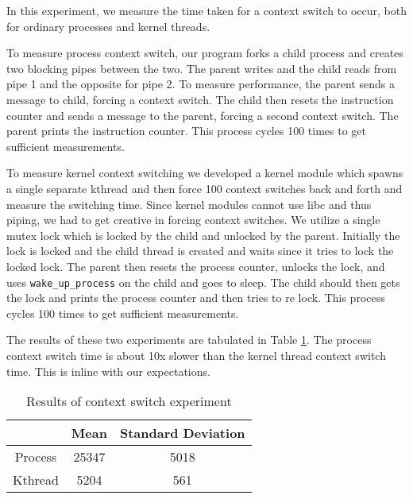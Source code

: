In this experiment, we measure the time taken for a context switch to occur, both for ordinary processes and kernel threads. 

To measure process context switch, our program forks a child process and creates two blocking pipes between the two.
The parent writes and the child reads from pipe 1 and the opposite for pipe 2.
To measure performance, the parent sends a message to child, forcing a context switch.
The child then resets the instruction counter and sends a message to the parent, forcing a second context switch.
The parent prints the instruction counter.
This process cycles 100 times to get sufficient measurements.

To measure kernel context switching we developed a kernel module which spawns a single separate kthread and then force 100 context switches back and forth and measure the switching time.
Since kernel modules cannot use libc and thus piping, we had to get creative in forcing context switches. 
We utilize a single mutex lock which is locked by the child and unlocked by the parent.
Initially the lock is locked and the child thread is created and waits since it tries to lock the locked lock.
The parent then resets the process counter, unlocks the lock, and uses {\tt wake\_up\_process} on the child and goes to sleep.
The child should then gets the lock and prints the process counter and then tries to re lock.
This process cycles 100 times to get sufficient measurements.

The results of these two experiments are tabulated in Table \ref{tab:exp1_5}.
The process context switch time is about 10x slower than the kernel thread context switch time.
This is inline with our expectations.

\begin{table}
\begin{tabular}{|c|c|c|}\hline
& Mean & Standard Deviation \\\hline
Process &  25347 & 5018\\
Kthread & 5204 & 561\\\hline
\end{tabular}
\caption{Results of context switch experiment}\label{tab:exp1_5}
\end{table}
